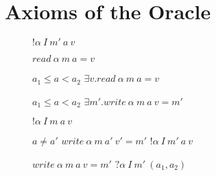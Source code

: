 \documentclass{article}
\begin{document}
\section{Axioms of the Oracle}
\label{sec:axioms}

\begin{figure}
  \begin{minipage}{0.33\textwidth}
             {\(! \alpha ~ I ~ m' ~ a ~ v\)}
  \end{minipage}
  \begin{minipage}{0.33\textwidth}
             {\(\mathit{read} ~ \alpha ~ m ~ a = v\)}
  \end{minipage}
  \begin{minipage}{0.33\textwidth}
                {\(a_1 \leq a < a_2\)}
                {\(\exists v . \mathit{read} ~ \alpha ~ m ~ a = v\)}
  \end{minipage}
  \begin{minipage}{0.33\textwidth}
                {\(a_1 \leq a < a_2\)}
                {\(\exists m' . \mathit{write} ~ \alpha ~ m ~ a ~ v = m'\)}
  \end{minipage}
  \begin{minipage}{0.33\textwidth}
             {\(! \alpha ~ I ~ m ~ a ~ v\)}
  \end{minipage}
  \begin{minipage}{0.33\textwidth}
                      {\(a \not = a'\)}
                      {\(\mathit{write} ~ \alpha ~ m ~ a' ~ v' = m'\)}
                      {\(! \alpha ~ I ~ m' ~ a ~ v\)}
  \end{minipage}
  \begin{minipage}{0.33\textwidth}
               {\(\mathit{write} ~ \alpha ~ m ~ a ~ v = m'\)}
               {\(? \alpha ~ I ~ m' ~ (a_1,a_2)\)}

\end{minipage}
\end{figure}
\end{document}

